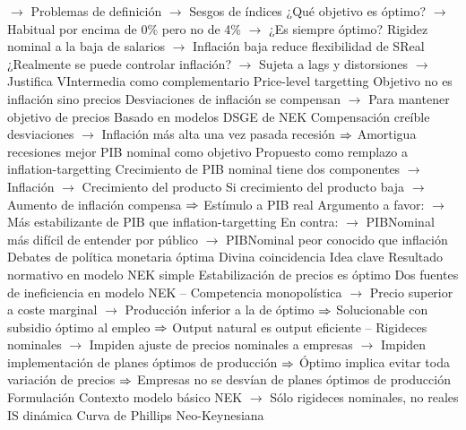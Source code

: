 \documentclass{nuevotema}
\begin{document}
\begin{esquemal}
				\4[] $\to$ Problemas de definición
				\4[] $\to$ Sesgos de índices
				\4[] ¿Qué objetivo es óptimo?
				\4[] $\to$ Habitual por encima de 0\% pero no de 4\%
				\4[] $\to$ ¿Es siempre óptimo?
				\4[] Rigidez nominal a la baja de salarios
				\4[] $\to$ Inflación baja reduce flexibilidad de SReal
				\4[] ¿Realmente se puede controlar inflación?
				\4[] $\to$ Sujeta a lags y distorsiones
				\4[] $\to$ Justifica VIntermedia como complementario
				\4 Price-level targetting
				\4[] Objetivo no es inflación sino precios
				\4[] Desviaciones de inflación se compensan
				\4[] $\to$ Para mantener objetivo de precios
				\4[] Basado en modelos DSGE de NEK
				\4[] Compensación creíble desviaciones
				\4[] $\to$ Inflación más alta una vez pasada recesión
				\4[] $\Rightarrow$ Amortigua recesiones mejor
				\4 PIB nominal como objetivo
				\4[] Propuesto como remplazo a inflation-targetting
				\4[] Crecimiento de PIB nominal tiene dos componentes
				\4[] $\to$ Inflación
				\4[] $\to$ Crecimiento del producto
				\4[] Si crecimiento del producto baja
				\4[] $\to$ Aumento de inflación compensa
				\4[] $\Rightarrow$ Estímulo a PIB real
				\4[] Argumento a favor:
				\4[] $\to$ Más estabilizante de PIB que inflation-targetting
				\4[] En contra:
				\4[] $\to$ PIBNominal más difícil de entender por público
				\4[] $\to$ PIBNominal peor conocido que inflación
		\2 Debates de política monetaria óptima
			\3 Divina coincidencia
				\4 Idea clave
				\4[] Resultado normativo en modelo NEK simple
				\4[] Estabilización de precios es óptimo
				\4[] Dos fuentes de ineficiencia en modelo NEK
				\4[] -- Competencia monopolística
				\4[] $\to$ Precio superior a coste marginal
				\4[] $\to$ Producción inferior a la de óptimo
				\4[] $\Rightarrow$ Solucionable con subsidio óptimo al empleo
				\4[] $\Rightarrow$ Output natural es output eficiente
				\4[] -- Rigideces nominales
				\4[] $\to$ Impiden ajuste de precios nominales a empresas
				\4[] $\to$ Impiden implementación de planes óptimos de producción
				\4[] $\Rightarrow$ Óptimo implica evitar toda variación de precios
				\4[] $\Rightarrow$ Empresas no se desvían de planes óptimos de producción
				\4 Formulación
				\4[] Contexto modelo básico NEK
				\4[] $\to$ Sólo rigideces nominales, no reales
				\4[DIS] IS dinámica
				\4[] 
				\4[NKPC] Curva de Phillips Neo-Keynesiana
				\4[] 

\end{esquemal}
\end{document}
